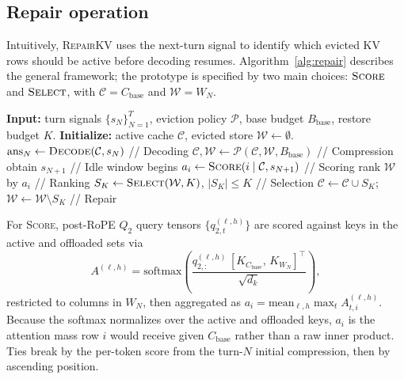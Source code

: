 \documentclass{article}
\newcommand{\repairkv}{\textsc{RepairKV}}
\newcommand{\bbase}{\ensuremath{B_{\mathrm{base}}}}
\begin{document}
\subsection{Repair operation}
Intuitively, \repairkv{} {uses the next-turn signal to identify which evicted KV rows should be active before decoding resumes.} Algorithm~\ref{alg:repair} describes the general framework; the prototype is specified by two main choices: {$\textsc{Score}$ and $\textsc{Select}$, with $\mathcal{C}=C_{\mathrm{base}}$ and $\mathcal{W}=W_N$.}
\begin{algorithm}[t]
\caption{General \repairkv{} Execution Framework}
\label{alg:repair}
\begin{algorithmic}[1]
\STATE \textbf{Input:} turn signals $\{s_N\}_{N=1}^T$, 
eviction policy $\mathcal{P}$, base budget $\bbase$, restore
budget $K$.
\STATE \textbf{Initialize:} active cache $\mathcal{C}$,
evicted store $\mathcal{W}\!\gets\!\emptyset$.
  \STATE $\mathrm{ans}_N \gets \textsc{Decode}(\mathcal{C}, s_N)$ \hfill // Decoding
  \STATE $\mathcal{C}, \mathcal{W} \gets \mathcal{P}(\mathcal{C}, \mathcal{W}, \bbase)$ \hfill // Compression
  \STATE obtain $s_{N+1}$ \hfill // Idle window begins
    \STATE $a_i \gets \textsc{Score}(i \mid \mathcal{C}, s_{N+1})$ \hfill // Scoring
  \ENDFOR
  \STATE rank $\mathcal{W}$ by $a_i$ \hfill // Ranking
  \STATE $S_K \gets \textsc{Select}(\mathcal{W}, K)$, $|S_K|\!\le\!K$ \hfill // Selection
  \STATE $\mathcal{C} \gets \mathcal{C}\!\cup\!S_K$;\, $\mathcal{W} \gets \mathcal{W}\!\setminus\!S_K$ \hfill // Repair
\ENDFOR
\end{algorithmic}
\end{algorithm}

For \textsc{Score}, post-RoPE $Q_2$ query tensors
$\{q^{(\ell,h)}_{2,t}\}$ are {scored} against keys in the active and
offloaded sets via
\begin{equation}
  A^{(\ell,h)} = \mathrm{softmax}\!\left(
    \frac{q^{(\ell,h)}_{2,:}\, [K_{C_{\mathrm{base}}},\, K_{W_N}]^{\top}}
         {\sqrt{d_k}}
  \right),
  \label{eq:score-attn}
\end{equation}
restricted to columns in $W_N$, then aggregated as
$a_i = \mathrm{mean}_{\ell, h} \max_t A^{(\ell,h)}_{t,i}$.
Because the softmax normalizes over the active and offloaded keys,
$a_i$ is the attention mass row $i$ would receive given
$C_{\mathrm{base}}$ rather than a raw inner product. Ties break
by the per-token score from the turn-$N$ initial compression, then
by ascending position.
\end{document}
